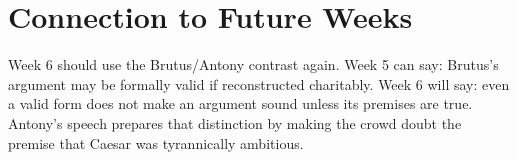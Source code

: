 \documentclass[12pt]{article}
\begin{document}
\section*{Connection to Future Weeks}
Week 6 should use the Brutus/Antony contrast again. Week 5 can say: Brutus's argument may be formally valid if reconstructed charitably. Week 6 will say: even a valid form does not make an argument sound unless its premises are true. Antony's speech prepares that distinction by making the crowd doubt the premise that Caesar was tyrannically ambitious.
\end{document}
